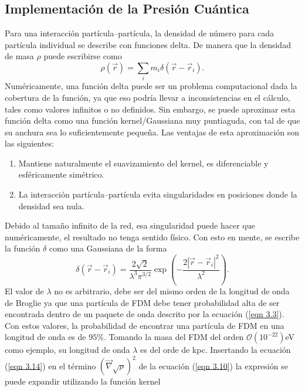 \documentclass[a4paper,openright,12pt]{book}
\begin{document}
\subsection{Implementación de la Presión Cuántica}
Para una interacción partícula--partícula, la densidad de número para cada partícula individual se describe con funciones delta. De manera que la densidad de masa $\rho$ puede escribirse como
\begin{equation}
\rho(\vec{r})
=
\sum_{i}m_{i}\delta(\vec{r}-\vec{r}_{i}).\label{eqn 3.13}
\end{equation}
Numéricamente, una función delta puede ser un problema computacional dada la cobertura de la función, ya que eso podría llevar a inconsistencias en el cálculo, tales como valores infinitos o no definidos. Sin embargo, se puede aproximar esta función delta como una función kernel/Gaussiana muy puntiaguda, con tal de que su anchura sea lo suficientemente pequeña.
Las ventajas de esta aproximación son las siguientes:
\begin{enumerate}
\item Mantiene naturalmente el suavizamiento del kernel, es diferenciable y esféricamente simétrico. 
\item La interacción partícula--partícula evita singularidades en posiciones donde la densidad sea nula.
\end{enumerate}
Debido al tamaño infinito de la red, esa singularidad puede hacer que numéricamente, el resultado no tenga sentido físico.
Con esto en mente, se escribe la función $\delta$ como una Gaussiana de la forma
\begin{equation}
\delta (\vec{r}-\vec{r}_{i}) = 
\frac{2\sqrt{2}}{\lambda ^{3} \pi ^{3/2}} \exp \left(-\frac{2|\vec{r}-\vec{r}_{i}|^{2}}{\lambda ^{2}}\right).\label{eqn 3.14}
\end{equation}
El valor de $\lambda$ no es arbitrario, debe ser del mismo orden de la longitud de onda de Broglie ya que una partícula de FDM debe tener probabilidad alta de ser encontrada dentro de un paquete de onda descrito por la ecuación (\ref{eqn 3.3}). Con estos valores, la probabilidad de encontrar una partícula de FDM en una longitud de onda es de $95 \%$. Tomando la masa del FDM del orden $\mathcal{O}(10^{-22})$eV como ejemplo, su longitud de onda $\lambda$ es del orde de kpc. Insertando la ecuación (\ref{eqn 3.14}) en el término $(\vec{\nabla}\sqrt{\rho})^{2}$ de la ecuación (\ref{eqn 3.10}) la expresión se puede expandir utilizando la función kernel
\end{document}
